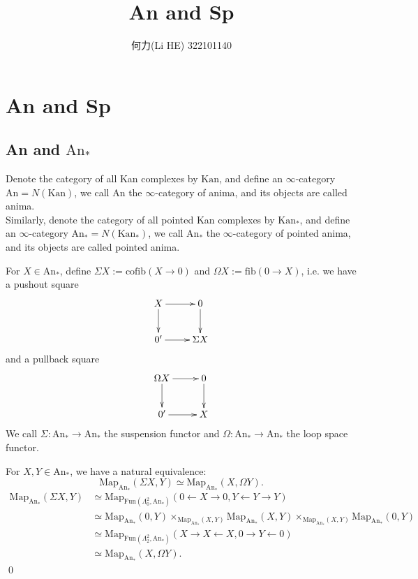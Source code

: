 \documentclass[UTF8,12,a4paper]{ctexart}
\theoremstyle{definition}
\newcommand{\An}{\text{An}}
\begin{document}
\large
\title{\vspace{-6em}\Large{An and Sp}}
\date{}
\author{何力(Li HE) 322101140}
\maketitle
\section{An and Sp}
\subsection{An and $\An_*$}
\dfn
Denote the category of all Kan complexes by $\text{Kan}$, and define an $\infty$-category
$\text{An}=N(\text{Kan})$, we call $\An$ the $\infty$-category of anima, and its objects are called anima.\\
Similarly, denote the category of all pointed Kan complexes by $\text{Kan}_*$, and define an $\infty$-category
$\text{An}_*=N(\text{Kan}_*)$, we call $\An_*$ the $\infty$-category of pointed anima, and its objects are called pointed anima.


\dfn 
For $X\in \An_*$, define $\Sigma X:=\text{cofib}(X\rightarrow 0)$ and 
$\Omega X:=\text{fib}(0\rightarrow X)$, i.e. we have a pushout square
\begin{equation*}
\xymatrix{
	X\ar[r] \ar[d]&0\ar[d]\\
	0^\prime \ar[r]& \Sigma X
}
\end{equation*}
and a pullback square
\begin{equation*}
\xymatrix{
	\Omega X\ar[r] \ar[d]&0\ar[d]\\
	0^\prime \ar[r]&  X
}
\end{equation*}
We call $\Sigma:\An_*\rightarrow \An_*$ the suspension functor and 
$\Omega: \An_*\rightarrow \An_*$ the loop space functor. 



\prop 
For $X, Y\in \An_*$, we have a natural equivalence:
$$
\text{Map}_{\An_*}(\Sigma X, Y)\simeq 
\text{Map}_{\An_*}(X,\Omega Y).
$$
\pf 
\begin{align*}
\text{Map}_{\An_*}(\Sigma X,Y)
&\simeq 
\text{Map}_{\text{Fun}(\Lambda^2_0,\An_*)}
(0\gets X\to 0, Y\gets Y\to Y)\\
&\simeq
\text{Map}_{\An_*}(0,Y)
\times_{\text{Map}_{\An_*}( X,Y)}
\text{Map}_{\An_*}( X,Y)
\times_{\text{Map}_{\An_*}( X,Y)}
\text{Map}_{\An_*}(0,Y)\\
&\simeq 
\text{Map}_{\text{Fun}(\Lambda^2_2,\An_*)}
(X\to X\gets X, 0\to Y\gets 0)\\
&\simeq
\text{Map}_{\An_*}( X,\Omega Y).
\end{align*}
\qed 
\end{document}
